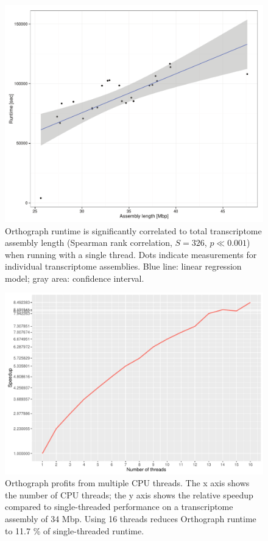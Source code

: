 \begin{figure}[htbp]
\centering
\includegraphics[width=\textwidth]{figures/runtime-vs-length.pdf}
\caption[Orthograph runtime is correlated to assembly length]{Orthograph
runtime is significantly correlated to total transcriptome assembly
length (Spearman rank correlation, $S = 326$, $p \ll 0.001$) when
running with a single thread. Dots indicate measurements for individual
transcriptome assemblies. Blue line: linear regression model; gray area:
confidence interval.}
\end{figure}

\begin{figure}[htbp]
\centering
\includegraphics[width=\textwidth]{figures/runtime-speedup.pdf}
\caption[Orthograph multithreading speedup graph]{Orthograph profits
from multiple CPU threads. The x axis shows the number of CPU threads;
the y axis shows the relative speedup compared to single-threaded
performance on a transcriptome assembly of 34 Mbp. Using 16 threads
reduces Orthograph runtime to 11.7 \% of single-threaded runtime.}
\end{figure}

